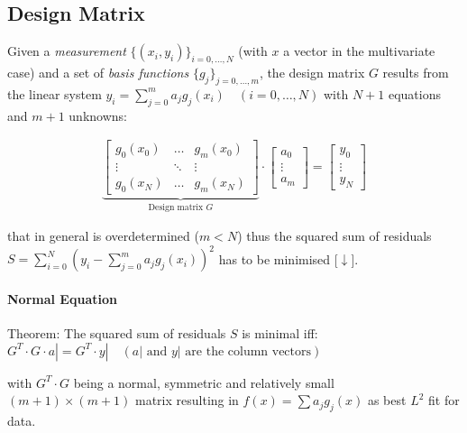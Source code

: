 \subsection{Design Matrix}
Given a \emph{measurement} $\{(x_i,y_i)\}_{i=0,\ldots,N}$ (with $x$ a vector in the multivariate case)
and a set of \emph{basis functions} $\{g_j\}_{j=0,\ldots,m}$,
the design matrix $G$ results from the linear system
$y_i=\sum_{j=0}^ma_jg_j(x_i)\quad(i=0,\ldots,N)$ with $N+1$ equations and $m+1$ unknowns:

\begin{snugshade*}
  \begin{align*}
    \underbrace{
      \begin{bmatrix}
        g_0(x_0) & \hdots & g_m(x_0) \\
        \vdots & \ddots & \vdots \\
        g_0(x_N) & \hdots & g_m(x_N)
      \end{bmatrix}
    }_{\text{Design matrix }G}
    \cdot
    \begin{bmatrix}
      a_0 \\
      \vdots \\
      a_m
    \end{bmatrix}
    =
    \begin{bmatrix}
      y_0 \\
      \vdots \\
      y_N
    \end{bmatrix}
  \end{align*}
\end{snugshade*}
that in general is overdetermined ($m<N$) thus the squared sum of residuals
$S=\sum_{i=0}^{N}\left(y_{i}-\sum_{j=0}^{m}a_{j}g_{j}(x_{i})\right)^{2}$
has to be minimised [$\downarrow$].

\paragraph{Normal Equation} Theorem: The squared sum of residuals $S$ is minimal iff:
\colorbox{shadecolor}{$
	G^T\cdot G\cdot a| = G^T\cdot y|\quad (a|\text{ and }y|\text{ are the column vectors})
$}

with $G^T\cdot G$ being a normal,
symmetric and relatively small $(m+1)\times(m+1)$ matrix resulting in $f(x)=\sum a_jg_j(x)$ as best $L^2$ fit for data.
